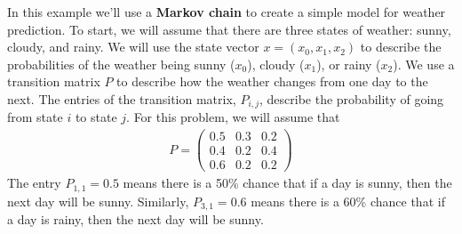 \documentclass[11pt]{report}
\begin{document}
\begin{Exercise}[title=Performing operations on NumPy arrays (Essential)]
  
\end{Exercise}


\begin{Exercise}[title=Weather prediction (Essential)]

  In this example we'll use a \textbf{Markov chain} to create a simple
  model for weather prediction. To start, we will assume that there are
  three states of weather: sunny, cloudy, and rainy. We
  will use the state vector $x = (x_0, x_1, x_2)$ to describe the probabilities
  of the weather being sunny ($x_0$), cloudy ($x_1$), or rainy ($x_2$).
  We use a transition matrix $P$ to describe how the weather changes from one
  day to the next. The entries of the transition matrix, $P_{i,j}$, describe
  the probability of going from state $i$ to state $j$. For this problem,
  we will assume that
  \begin{align}
    P = \begin{pmatrix}
      0.5 & 0.3 & 0.2 \\
      0.4 & 0.2 & 0.4 \\
      0.6 & 0.2 & 0.2
    \end{pmatrix}
  \end{align}
  The entry $P_{1,1} = 0.5$ means there is a 50\% chance that if a day is sunny,
  then the next day will be sunny. Similarly, $P_{3,1} = 0.6$ means there is a
  60\% chance that if a day is rainy, then the next day will be sunny.
  



\end{Exercise}
\end{document}
